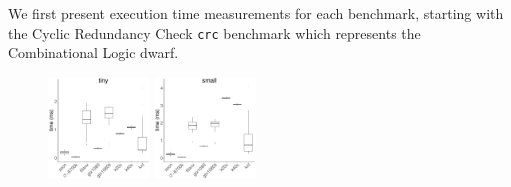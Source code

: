 \documentclass[../document.tex]{subfiles}
\begin{document}
\label{ssec:time}
	
We first present execution time measurements for each benchmark, starting with the Cyclic Redundancy Check {\tt crc} benchmark which represents the Combinational Logic dwarf.

\newcommand{\plotwidth}{0.24\textwidth}
\begin{figure}[t]
	\centering
	\includegraphics[width=\plotwidth]{figures/time-results/generate_crc_tiny_boxplot_knl-1}
	\includegraphics[width=\plotwidth]{figures/time-results/generate_crc_small_boxplot_knl-1}

\end{figure}
\end{document}
